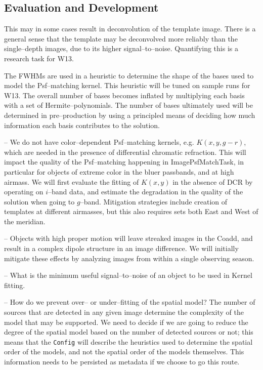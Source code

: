 \documentclass[12pt]{article}
\begin{document}
\subsection{Evaluation and Development}

This may in some cases result in
deconvolution of the template image.  There is a general sense that
the template may be deconvolved more reliably than the single--depth
images, due to its higher signal--to--noise.  Quantifying this is a
research task for W13.

The FWHMs are used in a heuristic to determine the shape of
the bases used to model the Psf--matching kernel.  This heuristic will
be tuned on sample runs for W13.  The overall number of bases becomes
inflated by multiplying each basis with a set of Hermite--polynomials.
The number of bases ultimately used will be determined in
pre--production by using a principled means of deciding how much
information each basis contributes to the solution.  

-- We do not have color--dependent Psf--matching kernels,
e.g. $K(x,y,g-r)$, which are needed in the presence of differential
chromatic refraction.  This will impact the quality of the
Psf--matching happening in ImagePsfMatchTask, in particular for
objects of extreme color in the bluer passbands, and at high airmass.
We will first evaluate the fitting of $K(x,y)$ in the absence of
DCR by operating on $i$--band data, and estimate the degradation in
the quality of the solution when going to $g$--band.  Mitigation
strategies include creation of templates at different airmasses, but
this also requires sets both East and West of the meridian.

-- Objects with high proper motion will leave streaked images in the
Coadd, and result in a complex dipole structure in an image
difference.  We will initially mitigate these effects by analyzing
images from within a single observing season.

-- What is the minimum useful signal--to--noise of an object to be
used in Kernel fitting.

-- How do we prevent over-- or under--fitting of the spatial model?
The number of sources that are detected in any given image determine
the complexity of the model that may be supported.  We need to decide
if we are going to reduce the degree of the spatial model based on the
number of detected sources or not; this means that the {\tt Config}
will describe the heuristics used to determine the spatial order of
the models, and not the spatial order of the models themselves.  This
information needs to be persisted as metadata if we choose to go this
route.
\end{document}

